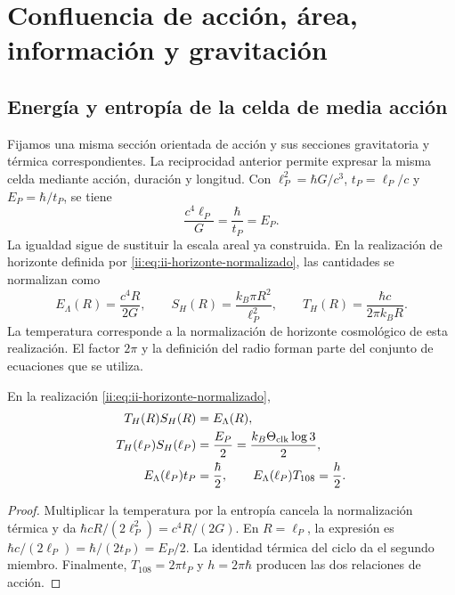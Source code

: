 \section{Confluencia de acción, área, información y gravitación}
\label{ii:sec:confluencia}

\subsection{Energía y entropía de la celda de media acción}

Fijamos una misma sección orientada de acción y sus secciones
gravitatoria y térmica correspondientes. La reciprocidad anterior permite expresar la misma celda mediante
acción, duración y longitud. Con
\(\ell_P^2=\hbar G/c^3\), \(t_P=\ell_P/c\) y
\(E_P=\hbar/t_P\), se tiene
\[
 \frac{c^4\ell_P}{G}=\frac{\hbar}{t_P}=E_P.
\]
La igualdad sigue de sustituir la escala areal ya construida. En la
realización de horizonte definida por \eqref{ii:eq:ii-horizonte-normalizado}, las cantidades
se normalizan como
\begin{equation}
 E_\Lambda(R)=\frac{c^4R}{2G},\qquad
 S_H(R)=\frac{k_B\pi R^2}{\ell_P^2},\qquad
 T_H(R)=\frac{\hbar c}{2\pi k_BR}.
 \label{ii:eq:ii-horizonte-normalizado}
\end{equation}
La temperatura corresponde a la normalización de horizonte cosmológico
de esta realización. El factor \(2\pi\) y la definición del radio
forman parte del conjunto de ecuaciones que se utiliza.

\begin{theorem}
En la realización \eqref{ii:eq:ii-horizonte-normalizado},
\begin{align}
 T_H(R)S_H(R)&=E_\Lambda(R),\\
 T_H(\ell_P)S_H(\ell_P)&=\frac{E_P}{2}
 =\frac{k_B\Theta_{\rm clk}\log3}{2},\\
 E_\Lambda(\ell_P)t_P&=\frac{\hbar}{2},\qquad
 E_\Lambda(\ell_P)T_{108}=\frac h2.
\end{align}
\end{theorem}
\begin{proof}
Multiplicar la temperatura por la entropía cancela la normalización
térmica y da \(\hbar cR/(2\ell_P^2)=c^4R/(2G)\).
En \(R=\ell_P\), la expresión es \(\hbar c/(2\ell_P)
=\hbar/(2t_P)=E_P/2\). La identidad térmica del ciclo da
el segundo miembro. Finalmente, \(T_{108}=2\pi t_P\) y
\(h=2\pi\hbar\) producen las dos relaciones de acción.
\end{proof}

